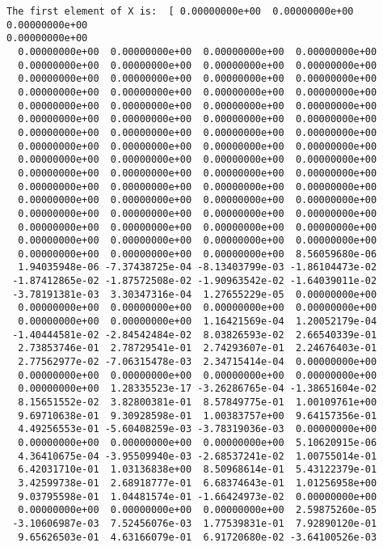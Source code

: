 \documentclass[11pt]{article}
\begin{document}
    \begin{Verbatim}[commandchars=\\\{\}]
The first element of X is:  [ 0.00000000e+00  0.00000000e+00  0.00000000e+00
0.00000000e+00
  0.00000000e+00  0.00000000e+00  0.00000000e+00  0.00000000e+00
  0.00000000e+00  0.00000000e+00  0.00000000e+00  0.00000000e+00
  0.00000000e+00  0.00000000e+00  0.00000000e+00  0.00000000e+00
  0.00000000e+00  0.00000000e+00  0.00000000e+00  0.00000000e+00
  0.00000000e+00  0.00000000e+00  0.00000000e+00  0.00000000e+00
  0.00000000e+00  0.00000000e+00  0.00000000e+00  0.00000000e+00
  0.00000000e+00  0.00000000e+00  0.00000000e+00  0.00000000e+00
  0.00000000e+00  0.00000000e+00  0.00000000e+00  0.00000000e+00
  0.00000000e+00  0.00000000e+00  0.00000000e+00  0.00000000e+00
  0.00000000e+00  0.00000000e+00  0.00000000e+00  0.00000000e+00
  0.00000000e+00  0.00000000e+00  0.00000000e+00  0.00000000e+00
  0.00000000e+00  0.00000000e+00  0.00000000e+00  0.00000000e+00
  0.00000000e+00  0.00000000e+00  0.00000000e+00  0.00000000e+00
  0.00000000e+00  0.00000000e+00  0.00000000e+00  0.00000000e+00
  0.00000000e+00  0.00000000e+00  0.00000000e+00  0.00000000e+00
  0.00000000e+00  0.00000000e+00  0.00000000e+00  8.56059680e-06
  1.94035948e-06 -7.37438725e-04 -8.13403799e-03 -1.86104473e-02
 -1.87412865e-02 -1.87572508e-02 -1.90963542e-02 -1.64039011e-02
 -3.78191381e-03  3.30347316e-04  1.27655229e-05  0.00000000e+00
  0.00000000e+00  0.00000000e+00  0.00000000e+00  0.00000000e+00
  0.00000000e+00  0.00000000e+00  1.16421569e-04  1.20052179e-04
 -1.40444581e-02 -2.84542484e-02  8.03826593e-02  2.66540339e-01
  2.73853746e-01  2.78729541e-01  2.74293607e-01  2.24676403e-01
  2.77562977e-02 -7.06315478e-03  2.34715414e-04  0.00000000e+00
  0.00000000e+00  0.00000000e+00  0.00000000e+00  0.00000000e+00
  0.00000000e+00  1.28335523e-17 -3.26286765e-04 -1.38651604e-02
  8.15651552e-02  3.82800381e-01  8.57849775e-01  1.00109761e+00
  9.69710638e-01  9.30928598e-01  1.00383757e+00  9.64157356e-01
  4.49256553e-01 -5.60408259e-03 -3.78319036e-03  0.00000000e+00
  0.00000000e+00  0.00000000e+00  0.00000000e+00  5.10620915e-06
  4.36410675e-04 -3.95509940e-03 -2.68537241e-02  1.00755014e-01
  6.42031710e-01  1.03136838e+00  8.50968614e-01  5.43122379e-01
  3.42599738e-01  2.68918777e-01  6.68374643e-01  1.01256958e+00
  9.03795598e-01  1.04481574e-01 -1.66424973e-02  0.00000000e+00
  0.00000000e+00  0.00000000e+00  0.00000000e+00  2.59875260e-05
 -3.10606987e-03  7.52456076e-03  1.77539831e-01  7.92890120e-01
  9.65626503e-01  4.63166079e-01  6.91720680e-02 -3.64100526e-03

\end{Verbatim}
\end{document}
